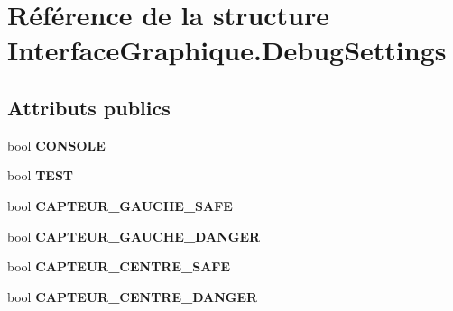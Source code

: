 \hypertarget{struct_interface_graphique_1_1_debug_settings}{\section{Référence de la structure Interface\-Graphique.\-Debug\-Settings}
\label{struct_interface_graphique_1_1_debug_settings}
}
\subsection*{Attributs publics}
\begin{DoxyCompactItemize}
\item 
\hypertarget{struct_interface_graphique_1_1_debug_settings_a75c1a7d37579c62063cd379767db44b1}{bool {\bfseries C\-O\-N\-S\-O\-L\-E}}\label{struct_interface_graphique_1_1_debug_settings_a75c1a7d37579c62063cd379767db44b1}

\item 
\hypertarget{struct_interface_graphique_1_1_debug_settings_a3ef4b71c102726300d02f36f5ed026ff}{bool {\bfseries T\-E\-S\-T}}\label{struct_interface_graphique_1_1_debug_settings_a3ef4b71c102726300d02f36f5ed026ff}

\item 
\hypertarget{struct_interface_graphique_1_1_debug_settings_a043bc5896c944a1b1c2142a05d6683ce}{bool {\bfseries C\-A\-P\-T\-E\-U\-R\-\_\-\-G\-A\-U\-C\-H\-E\-\_\-\-S\-A\-F\-E}}\label{struct_interface_graphique_1_1_debug_settings_a043bc5896c944a1b1c2142a05d6683ce}

\item 
\hypertarget{struct_interface_graphique_1_1_debug_settings_ace69b2e6e35ede3869738c14d1755007}{bool {\bfseries C\-A\-P\-T\-E\-U\-R\-\_\-\-G\-A\-U\-C\-H\-E\-\_\-\-D\-A\-N\-G\-E\-R}}\label{struct_interface_graphique_1_1_debug_settings_ace69b2e6e35ede3869738c14d1755007}

\item 
\hypertarget{struct_interface_graphique_1_1_debug_settings_a58e64a587982d368345c18fd928cec9c}{bool {\bfseries C\-A\-P\-T\-E\-U\-R\-\_\-\-C\-E\-N\-T\-R\-E\-\_\-\-S\-A\-F\-E}}\label{struct_interface_graphique_1_1_debug_settings_a58e64a587982d368345c18fd928cec9c}

\item 
\hypertarget{struct_interface_graphique_1_1_debug_settings_a8739c714b05a5809230a0d56f7ba0176}{bool {\bfseries C\-A\-P\-T\-E\-U\-R\-\_\-\-C\-E\-N\-T\-R\-E\-\_\-\-D\-A\-N\-G\-E\-R}}\label{struct_interface_graphique_1_1_debug_settings_a8739c714b05a5809230a0d56f7ba0176}


\end{DoxyCompactItemize}
